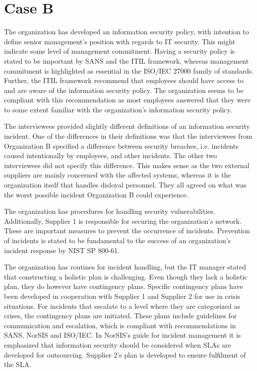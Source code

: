 \section{Case B}
\label{sec:discussionCaseB}
The organization has developed an information security policy, with intention to define senior management's position with regards to IT security. This might indicate some level of management commitment. Having a security policy is stated to be important by SANS and the ITIL framework, whereas management commitment is highlighted as essential in the ISO/IEC 27000 family of standards. Further, the ITIL framework recommend that employees should have access to and are aware of the information security policy. The organization seems to be compliant with this recommendation as most employees answered that they were to some extent familiar with the organization's information security policy. 

The interviewees provided slightly different definitions of an information security incident. One of the differences in their definitions was that the interviewees from Organization B specified a difference between security breaches, i.e. incidents caused intentionally by employees, and other incidents. The other two interviewees did not specify this difference. This makes sense as the two external suppliers are mainly concerned with the affected systems, whereas it is the organization itself that handles disloyal personnel. They all agreed on what was the worst possible incident Organization B could experience.

The organization has procedures for handling security vulnerabilities. Additionally, Supplier 1 is responsible for securing the organization's network. These are important measures to prevent the occurrence of incidents. Prevention of incidents is stated to be fundamental to the success of an organization's incident response by NIST SP 800-61. 

The organization has routines for incident handling, but the IT manager stated that constructing a holistic plan is challenging. Even though they lack a holistic plan, they do however have contingency plans. Specific contingency plans have been developed in cooperation with Supplier 1 and Supplier 2 for use in crisis situations. For incidents that escalate to a level where they are categorized as crises, the contingency plans are initiated. These plans include guidelines for communication and escalation, which is compliant with recommendations in SANS, NorSIS and ISO/IEC. In NorSIS's guide for incident management it is emphasized that information security should be considered when \acp{SLA} are developed for outsourcing. Supplier 2's plan is developed to ensure fulfilment of the \ac{SLA}. 

